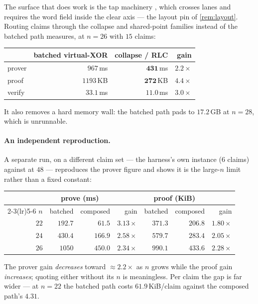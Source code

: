 The surface that does work is the tap machinery , which crosses
lanes and requires the word field inside the clear axis --- the layout pin of
\cref{rem:layout}. Routing claims through the collapse and shared-point families
instead of the batched path measures, at $n{=}26$ with $15$ claims:

\begin{center}\small
\begin{tabular}{@{}lrrr@{}}
\toprule
& batched virtual-XOR & collapse / RLC & gain\\
\midrule
prover & $967$\,ms & $\mathbf{431}$\,ms & $2.2\times$\\
proof & $1193$\,KB & $\mathbf{272}$\,KB & $4.4\times$\\
verify & $33.1$\,ms & $\mathbf{11.0}$\,ms & $3.0\times$\\
\bottomrule
\end{tabular}
\end{center}

\noindent
It also removes a hard memory wall: the batched path pads to $17.2$\,GB at
$n{=}28$, which is unrunnable.

\paragraph{An independent reproduction.} A separate run, on a different claim
set --- the harness's own  instance ($6$ claims) against
 at $48$ --- reproduces the prover figure and shows it is
the large-$n$ limit rather than a fixed constant:

\begin{center}\small
\begin{tabular}{@{}rrrrrrr@{}}
\toprule
& \multicolumn{2}{c}{prove (ms)} & & \multicolumn{2}{c}{proof (KiB)} &\\
\cmidrule(lr){2-3}\cmidrule(lr){5-6}
$n$ & batched & composed & gain & batched & composed & gain\\
\midrule
$22$ & $192.7$  & $61.5$  & $3.13\times$ & $371.3$ & $206.8$ & $1.80\times$\\
$24$ & $430.4$  & $166.9$ & $2.58\times$ & $579.7$ & $283.4$ & $2.05\times$\\
$26$ & $1050$   & $450.0$ & $2.34\times$ & $990.1$ & $433.6$ & $2.28\times$\\
\bottomrule
\end{tabular}
\end{center}

\noindent
The prover gain \emph{decreases} toward $\approx2.2\times$ as $n$ grows while the
proof gain \emph{increases}; quoting either without its $n$ is meaningless. Per
claim the gap is far wider --- at $n{=}22$ the batched path costs
$61.9$\,KiB/claim against the composed path's $4.31$.

